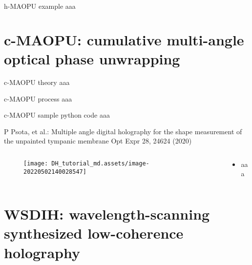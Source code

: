 \documentclass[t, aspectratio=169]{beamer}
\begin{document}
\begin{frame}{h-MAOPU example}
aaa
\end{frame}


\section{c-MAOPU: cumulative multi-angle optical phase unwrapping}
\begin{frame}[c]
	\centering\LARGE\textbf{\secname}
\end{frame}


\begin{frame}{c-MAOPU theory}
aaa
\end{frame}


\begin{frame}{c-MAOPU process}
aaa
\end{frame}


\begin{frame}{c-MAOPU sample python code}
aaa
\end{frame}


\begin{frame}{P Psota, et al.: Multiple angle digital holography for the shape measurement of the unpainted tympanic membrane}
	\vspace{-3 mm}
	\small Opt Expr  28, 24624 (2020)
	\begin{columns}
		\begin{column}{.6\textwidth}
			\begin{figure}
				\texttt{[image: DH\_tutorial\_md.assets/image-20220502140028547]}
			\end{figure}
		\end{column}
		\begin{column}{.4\textwidth}
			\begin{itemize}
				\item aaa
			\end{itemize}
		\end{column}
	\end{columns}
\end{frame}


\section{WSDIH: wavelength-scanning synthesized low-coherence holography}
\begin{frame}[c]
	\centering\LARGE\textbf{\secname}
\end{frame}
\end{document}
